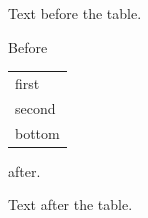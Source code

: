 \documentclass[12pt]{article}
\begin{document}
Text before the table.

Before \begin{tabular}[b]{l}first\\second\\bottom\end{tabular} after.

Text after the table.
\end{document}
